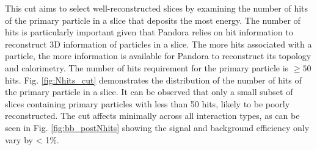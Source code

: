 This cut aims to select well-reconstructed slices by examining the number of hits of the primary particle in a slice that deposits the most energy.
The number of hits is particularly important given that Pandora relies on hit information to reconstruct 3D information of particles in a slice.                                                                  
The more hits associated with a particle, the more information is available for Pandora to reconstruct its topology and calorimetry.
The number of hits requirement for the primary particle is $\geq 50$ hits.
Fig. \ref{fig:Nhits_cut} demonstrates the distribution of the number of hits of the primary particle in a slice. 
It can be observed that only a small subset of slices containing primary particles with less than 50 hits, likely to be poorly reconstructed.
The cut affects minimally across all interaction types, as can be seen in Fig. \ref{fig:bb_postNhits} showing the signal and background efficiency only vary by < 1\%.


